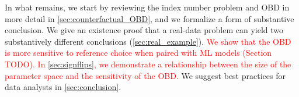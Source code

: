 In what remains, we start by reviewing the index number problem and OBD in more detail in \cref{sec:counterfactual_OBD}, and we formalize
a form of substantive conclusion.
We give an existence proof that a real-data problem can yield two substantively different conclusions (\cref{sec:real_example}).
\textcolor{red}{We show that the OBD is more sensitive to reference choice when paired with ML models (Section TODO).}
\textcolor{red}{In \cref{sec:signflips}, we demonstrate a relationship between the size of the parameter space and the sensitivity of the OBD.}
We suggest best practices for data analysts in \cref{sec:conclusion}.












